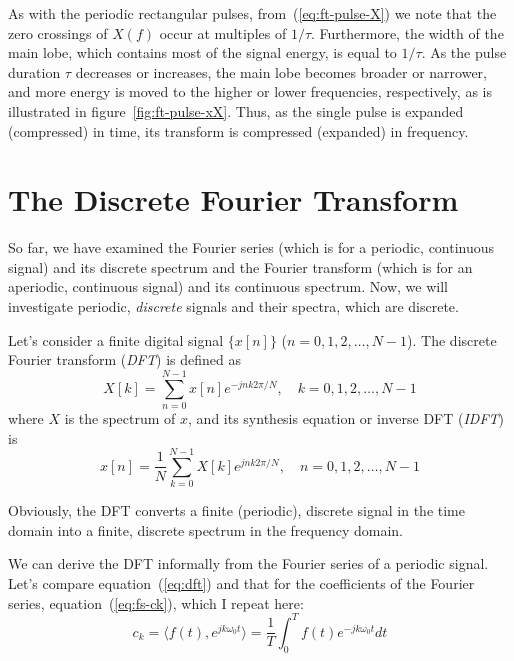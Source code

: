 As with the periodic rectangular pulses, from~(\ref{eq:ft-pulse-X}) we
note that the zero crossings of $X(f)$ occur at multiples of $1/\tau$.
Furthermore, the width of the main lobe, which contains most of the
signal energy, is equal to $1/\tau$. As the pulse duration $\tau$
decreases or increases, the main lobe becomes broader or narrower, and
more energy is moved to the higher or lower frequencies, respectively,
as is illustrated in figure~\ref{fig:ft-pulse-xX}. Thus, as the single
pulse is expanded (compressed) in time, its transform is compressed
(expanded) in frequency.

\section{The Discrete Fourier Transform}

So far, we have examined the Fourier series (which is for a
periodic, continuous signal) and its discrete spectrum and the Fourier
transform (which is for an aperiodic, continuous signal) and its
continuous spectrum. Now, we will investigate periodic, \emph{discrete}
signals and their spectra, which are discrete.

Let's consider a finite digital signal $\{x[n]\}$ ($n=0,1,2,\ldots,
N-1$). The discrete Fourier transform (\emph{DFT}) is defined as
\begin{equation}
X[k] = \sum_{n=0}^{N-1} x[n] e^{-j n k 2\pi/N}, \quad k = 0,1,2,\ldots,
N-1
\label{eq:dft}
\end{equation}
where $X$ is the spectrum of $x$, and its synthesis equation or
inverse DFT (\emph{IDFT}) is
\begin{equation}
x[n]=\frac{1}{N} \sum_{k=0}^{N-1} X[k] e^{j n k 2\pi/N}, \quad
n=0,1,2,\ldots, N-1
\label{eq:idft}
\end{equation}

Obviously, the DFT converts a finite (periodic), discrete signal in
the time domain into a finite, discrete spectrum in the frequency
domain.

We can derive the DFT informally from the Fourier series of a periodic
signal. Let's compare equation~(\ref{eq:dft}) and that for the
coefficients of the Fourier series, equation~(\ref{eq:fs-ck}), which I
repeat here:
\begin{equation}
c_k=\langle f(t), e^{jk\omega_0 t}\rangle = \frac{1}{T}\int_0^T f(t)e^{-jk\omega_0
t}dt
\label{eq:fs-ckrepeat}
\end{equation}

